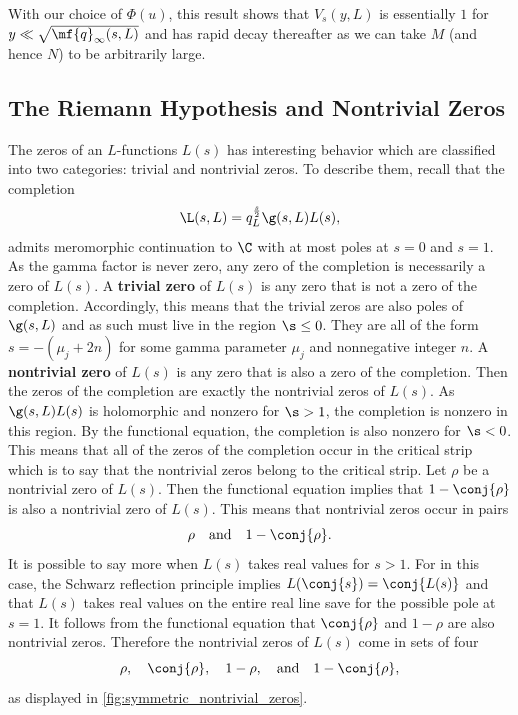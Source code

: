 \documentclass[12pt]{article}
\begin{document}
      With our choice of \(\Phi(u)\), this result shows that \(V_{s}(y,L)\) is essentially \(1\) for \(y \ll \sqrt{\mf{q}_{\infty}(s,L)}\) and has rapid decay thereafter as we can take \(M\) (and hence \(N\)) to be arbitrarily large.
    \subsection{The Riemann Hypothesis and Nontrivial Zeros}
      The zeros of an \(L\)-functions \(L(s)\) has interesting behavior which are classified into two categories: trivial and nontrivial zeros. To describe them, recall that the completion
      \[
        \L(s,L) = q_{L}^{\frac{s}{2}}\g(s,L)L(s),
      \]
      admits meromorphic continuation to \(\C\) with at most poles at \(s = 0\) and \(s = 1\). As the gamma factor is never zero, any zero of the completion is necessarily a zero of \(L(s)\). A \textbf{trivial zero} of \(L(s)\) is any zero that is not a zero of the completion. Accordingly, this means that the trivial zeros are also poles of \(\g(s,L)\) and as such must live in the region \(\s \le 0\). They are all of the form \(s = -(\mu_{j}+2n)\) for some gamma parameter \(\mu_{j}\) and nonnegative integer \(n\). A \textbf{nontrivial zero} of \(L(s)\) is any zero that is also a zero of the completion. Then the zeros of the completion are exactly the nontrivial zeros of \(L(s)\). As \(\g(s,L)L(s)\) is holomorphic and nonzero for \(\s > 1\), the completion is nonzero in this region. By the functional equation, the completion is also nonzero for \(\s < 0\). This means that all of the zeros of the completion occur in the critical strip which is to say that the nontrivial zeros belong to the critical strip. Let \(\rho\) be a nontrivial zero of \(L(s)\). Then the functional equation implies that \(1-\conj{\rho}\) is also a nontrivial zero of \(L(s)\). This means that nontrivial zeros occur in pairs
      \[
        \rho \quad \text{and} \quad 1-\conj{\rho}.
      \]
      It is possible to say more when \(L(s)\) takes real values for \(s > 1\). For in this case, the Schwarz reflection principle implies \(L(\conj{s}) = \conj{L(s)}\) and that \(L(s)\) takes real values on the entire real line save for the possible pole at \(s = 1\). It follows from the functional equation that \(\conj{\rho}\) and \(1-\rho\) are also nontrivial zeros. Therefore the nontrivial zeros of \(L(s)\) come in sets of four
      \[
        \rho, \quad \conj{\rho}, \quad 1-\rho, \quad \text{and} \quad 1-\conj{\rho},
      \]
      as displayed in \cref{fig:symmetric_nontrivial_zeros}.
\end{document}
